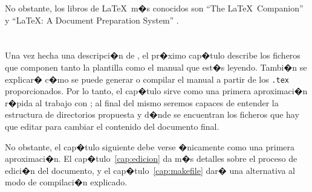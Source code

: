 No obstante, los libros de \LaTeX\ m�s conocidos son ``The \LaTeX\
Companion'' \citep{latexCompanion} y ``\LaTeX: A Document Preparation
System'' \citep{LaTeXLamport}.

\section*{\ProximoCapitulo}
\TocProximoCapitulo

Una vez hecha una descripci�n de \texis, el pr�ximo cap�tulo
describe los ficheros que componen tanto la plantilla como el manual
que est�s leyendo. Tambi�n se explicar� c�mo se puede generar o
compilar el manual a partir de los \texttt{.tex} proporcionados. Por
lo tanto, el cap�tulo sirve como una primera aproximaci�n r�pida al
trabajo con \texis; al final del mismo seremos capaces de entender
la estructura de directorios propuesta y d�nde se encuentran los
ficheros que hay que editar para cambiar el contenido del documento
final.

No obstante, el cap�tulo siguiente debe verse �nicamente como una
primera aproximaci�n. El cap�tulo~\ref{cap:edicion} da m�s detalles
sobre el proceso de edici�n del documento, y el
cap�tulo~\ref{cap:makefile} dar� una alternativa al modo de
compilaci�n explicado.

